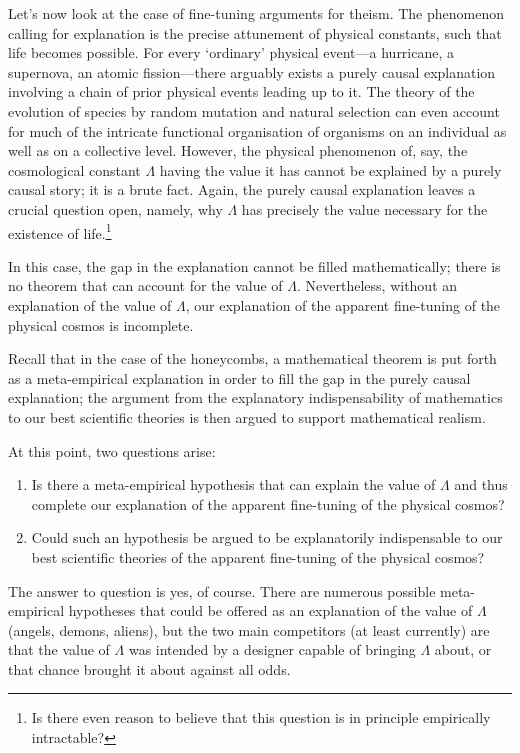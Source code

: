 \documentclass[a4paper,12pt]{article}
\begin{document}
Let's now look at the case of fine-tuning arguments for theism. The phenomenon calling for explanation is the precise attunement of physical constants, such that life becomes possible. For every `ordinary' physical event---a hurricane, a supernova, an atomic fission---there arguably exists a purely causal explanation involving a chain of prior physical events leading up to it.
The theory of the evolution of species by random mutation and natural selection can even account for much of the intricate functional organisation of organisms on an individual as well as on a collective level. However, the physical phenomenon of, say, the cosmological constant $\Lambda$ having the value it has cannot be explained by a purely causal story; it is a brute fact. Again, the purely causal explanation leaves a crucial question open, namely, why $\Lambda$ has precisely the value necessary for the existence of life.\footnote{Is there even reason to believe that this question is in principle empirically intractable?}

In this case, the gap in the explanation cannot be filled mathematically; there is no theorem that can account for the value of $\Lambda$. Nevertheless, without an explanation of the value of $\Lambda$, our explanation of the apparent fine-tuning of the physical cosmos is incomplete.

Recall that in the case of the honeycombs, a mathematical theorem is put forth as a meta-empirical explanation in order to fill the gap in the purely causal explanation; the argument from the explanatory indispensability of mathematics to our best scientific theories is then argued to support mathematical realism. 

At this point, two questions arise:


\begin{enumerate}
\item Is there a meta-empirical hypothesis that can explain the value of $\Lambda$ and thus complete our explanation of the apparent fine-tuning of the physical cosmos?

\item Could such an hypothesis be argued to be explanatorily indispensable to our best scientific theories of the apparent fine-tuning of the physical cosmos?
\end{enumerate}


The answer to question is yes, of course. There are numerous possible meta-empirical hypotheses that could be offered as an explanation of the value of $\Lambda$ (angels, demons, aliens), but the two main competitors (at least currently) are that the value of $\Lambda$ was intended by a designer capable of bringing $\Lambda$ about, or that chance brought it about against all odds.
\end{document}

